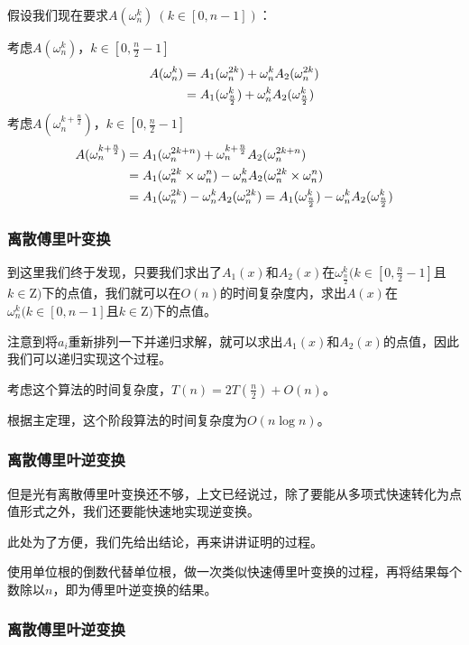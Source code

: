 \documentclass[10pt]{beamer}
\begin{document}
\begin{spacing}{1.2}
\begin{frame}
			假设我们现在要求$A(\omega_n^k) \ (k \in [0,n-1])$： \pause

			考虑$A(\omega_n^k)$，$k \in [0,\frac{n}{2}-1]$
			\begin{align}
				A(\omega_n^k) &= A_1(\omega_n^{2k}) + \omega_n^k A_2(\omega_n^{2k}) \notag \\ &= A_1(\omega_{\frac{n}{2}}^k) + \omega_n^k A_2(\omega_{\frac{n}{2}}^k) \notag
			\end{align} \pause
			考虑$A(\omega_n^{k+\frac{n}{2}})$，$k \in [0,\frac{n}{2}-1]$
			\begin{align}
				A(\omega_n^{k+\frac{n}{2}}) &= A_1(\omega_n^{2k+n}) + \omega_n^{k+\frac{n}{2}} A_2(\omega_n^{2k+n}) \notag \\
				&= A_1(\omega_n^{2k} \times \omega_n^n) - \omega_n^k A_2(\omega_n^{2k} \times \omega_n^n) \notag \\
				&= A_1(\omega_n^{2k}) - \omega_n^k A_2(\omega_n^{2k}) \notag = A_1(\omega_{\frac{n}{2}}^k) - \omega_n^k A_2(\omega_{\frac{n}{2}}^k) \notag
			\end{align}
		\end{frame}

		\begin{frame}
			\frametitle{离散傅里叶变换}
			到这里我们终于发现，只要我们求出了$A_1(x)$和$A_2(x)$在$\omega_{\frac{n}{2}}^k(k \in [0,\frac{n}{2}-1]$且$k \in \mathrm{Z})$下的点值，我们就可以在$O(n)$的时间复杂度内，求出$A(x)$在$\omega_n^k(k \in [0,n-1]$且$k \in \mathrm{Z})$下的点值。 \pause

			注意到将$a_i$重新排列一下并递归求解，就可以求出$A_1(x)$和$A_2(x)$的点值，因此我们可以递归实现这个过程。

			考虑这个算法的时间复杂度，$T(n) = 2T(\frac{n}{2}) + O(n)$。 \pause

			根据主定理，这个阶段算法的时间复杂度为$O(n \log n)$。
		\end{frame}
		\begin{frame}
			\frametitle{离散傅里叶逆变换}
			但是光有离散傅里叶变换还不够，上文已经说过，除了要能从多项式快速转化为点值形式之外，我们还要能快速地实现逆变换。 \pause

			此处为了方便，我们先给出结论，再来讲讲证明的过程。 \pause

			使用单位根的倒数代替单位根，做一次类似快速傅里叶变换的过程，再将结果每个数除以$n$，即为傅里叶逆变换的结果。
		\end{frame}

		\begin{frame}
			\frametitle{离散傅里叶逆变换}


\end{frame}
\end{spacing}
\end{document}
